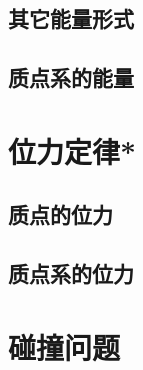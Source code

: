\subsection{其它能量形式}

\subsection{质点系的能量}


\section{位力定律*}

\subsection{质点的位力}

\subsection{质点系的位力}


\section{碰撞问题}

